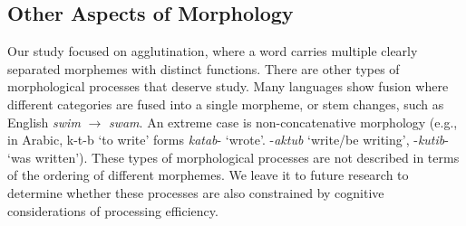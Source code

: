 \documentclass[11pt,letterpaper]{article}
\newcommand{\citep}{\parencite}
\begin{document}













\subsection{Other Aspects of Morphology}

Our study focused on agglutination, where a word carries multiple clearly separated morphemes with distinct functions.
There are other types of morphological processes that deserve study.
Many languages show fusion \citep{wals-20} where different categories are fused into a single morpheme, or stem changes, such as English \textit{swim} $\rightarrow$ \textit{swam}.
An extreme case is non-concatenative morphology (e.g., in Arabic, k-t-b `to write' forms \textit{katab}- `wrote'. -\textit{aktub} `write/be writing', -\textit{kutib}- `was written').
These types of morphological processes are not described in terms of the ordering of different morphemes.
We leave it to future research to determine whether these processes are also constrained by cognitive considerations of processing efficiency.
\end{document}
